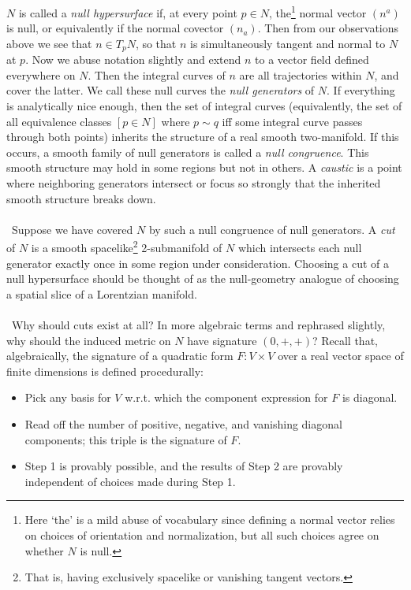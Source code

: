 \documentclass[11pt,letterpaper]{article}
\begin{document}
$N$ is called a \textit{null hypersurface} if, at every point $p \in N$, the\footnote{Here `the' is a mild abuse of vocabulary since defining a normal vector relies on choices of orientation and normalization, but all such choices agree on whether $N$ is null.} normal vector $(n^a)$ is null, or equivalently if the normal covector $(n_a)$. Then from our observations above we see that $n \in T_p N$, so that $n$ is simultaneously tangent and normal to $N$ at $p$. Now we abuse notation slightly and extend $n$ to a vector field defined everywhere on $N$. Then the integral curves of $n$ are all trajectories within $N$, and cover the latter. We call these null curves the \textit{null generators} of $N$. If everything is analytically nice enough, then the set of integral curves (equivalently, the set of all equivalence classes $[p \in N]$ where $p \sim q$ iff some integral curve passes through both points) inherits the structure of a real smooth two-manifold. If this occurs, a smooth family of null generators is called a \textit{null congruence}. This smooth structure may hold in some regions but not in others. A \textit{caustic} is a point where neighboring generators intersect or focus so strongly that the inherited smooth structure breaks down.\\
\\
\
Suppose we have covered $N$ by such a null congruence of null generators. A \textit{cut} of $N$ is a smooth spacelike\footnote{That is, having exclusively spacelike or vanishing tangent vectors.} 2-submanifold of $N$ which intersects each null generator exactly once in some region under consideration. Choosing a cut of a null hypersurface should be thought of as the null-geometry analogue of choosing a spatial slice of a Lorentzian manifold.\\
\\
\
Why should cuts exist at all? In more algebraic terms and rephrased slightly, why should the induced metric on $N$ have signature $(0,+,+)$? Recall that, algebraically, the signature of a quadratic form $F: V \times V$ over a real vector space of finite dimensions is defined procedurally: \begin{itemize}
    \item Pick any basis for $V$ w.r.t. which the component expression for $F$ is diagonal.
    \item Read off the number of positive, negative, and vanishing diagonal components; this triple is the signature of $F$.
    \item Step 1 is provably possible, and the results of Step 2 are provably independent of choices made during Step 1.
\end{itemize}
\end{document}
